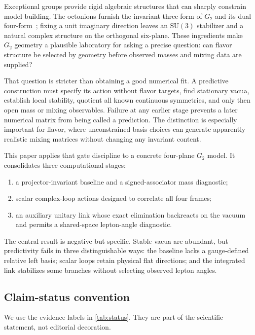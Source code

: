 \documentclass[11pt]{article}
\newcommand{\SU}{\mathrm{SU}}
\begin{document}
Exceptional groups provide rigid algebraic structures that can sharply constrain model building.  The octonions furnish the invariant three-form of $G_2$ and its dual four-form~\cite{Baez2002,Bryant1987}; fixing a unit imaginary direction leaves an $\SU(3)$ stabilizer and a natural complex structure on the orthogonal six-plane.  These ingredients make $G_2$ geometry a plausible laboratory for asking a precise question: can flavor structure be selected by geometry before observed masses and mixing data are supplied?

That question is stricter than obtaining a good numerical fit.  A predictive construction must specify its action without flavor targets, find stationary vacua, establish local stability, quotient all known continuous symmetries, and only then open mass or mixing observables.  Failure at any earlier stage prevents a later numerical matrix from being called a prediction.  The distinction is especially important for flavor, where unconstrained basis choices can generate apparently realistic mixing matrices without changing any invariant content.

This paper applies that gate discipline to a concrete four-plane $G_2$ model.  It consolidates three computational stages:
\begin{enumerate}[leftmargin=2.1em]
  \item a projector-invariant baseline and a signed-associator mass diagnostic;
  \item scalar complex-loop actions designed to correlate all four frames;
  \item an auxiliary unitary link whose exact elimination backreacts on the vacuum and permits a shared-space lepton-angle diagnostic.
\end{enumerate}
The central result is negative but specific.  Stable vacua are abundant, but predictivity fails in three distinguishable ways: the baseline lacks a gauge-defined relative left basis; scalar loops retain physical flat directions; and the integrated link stabilizes some branches without selecting observed lepton angles.

\subsection{Claim-status convention}

We use the evidence labels in \cref{tab:status}.  They are part of the scientific statement, not editorial decoration.
\end{document}
